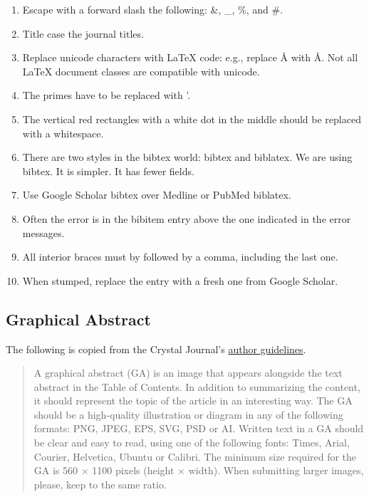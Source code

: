 \documentclass[11pt,letterpaper]{article}
\begin{document}
\begin{enumerate}
\item Escape with a forward slash the following: \&, \_, \%, and \#.
\item Title case the journal titles.
\item Replace unicode characters with \LaTeX{} code: e.g., replace Å with Å.
Not all \LaTeX{} document classes are compatible with unicode.
\item The primes have to be replaced with '.
\item The vertical red rectangles with a white dot in the middle should be
replaced with a whitespace.
\item There are two styles in the bibtex world: bibtex and biblatex. We are
using bibtex. It is simpler. It has fewer fields.
\item Use Google Scholar bibtex over Medline or PubMed biblatex.
\item Often the error is in the bibitem entry above the one indicated in
the error messages.
\item All interior braces must by followed by a comma, including the last
one.
\item When stumped, replace the entry with a fresh one from Google
Scholar.
\end{enumerate}

\subsection{Graphical Abstract}
\label{sec:org7749b1a}

The following is copied from the Crystal Journal's
\href{https://www.mdpi.com/journal/crystals/instructions\#preparation}{author
guidelines}.

\begin{quote}
A graphical abstract (GA) is an image that appears alongside the text
abstract in the Table of Contents. In addition to summarizing the
content, it should represent the topic of the article in an interesting
way. The GA should be a high-quality illustration or diagram in any of
the following formats: PNG, JPEG, EPS, SVG, PSD or AI. Written text in a
GA should be clear and easy to read, using one of the following fonts:
Times, Arial, Courier, Helvetica, Ubuntu or Calibri. The minimum size
required for the GA is 560 \(\times\) 1100 pixels (height \(\times\)
width). When submitting larger images, please, keep to the same ratio.
\end{quote}
\end{document}
